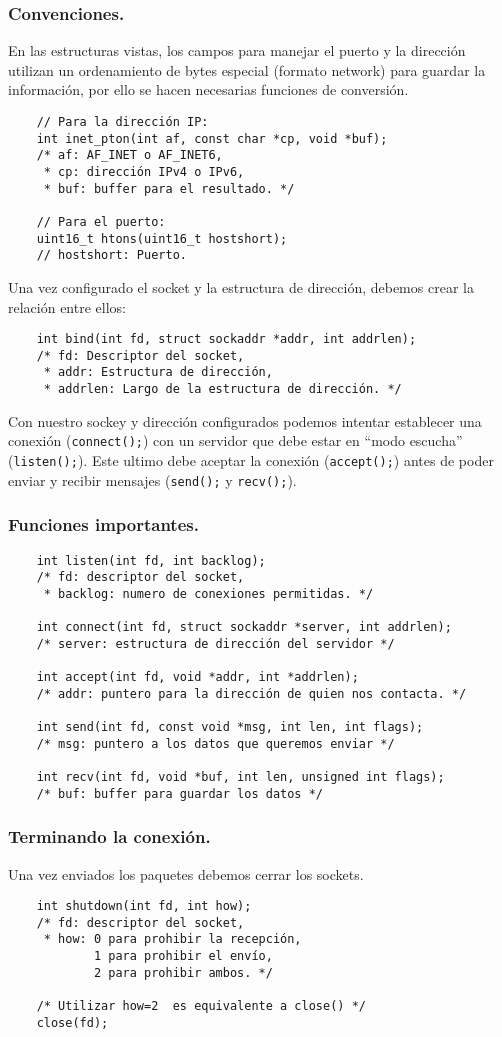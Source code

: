 \documentclass{beamer}
\begin{document}
\begin{frame}[fragile]
	\frametitle{Convenciones.}
	En las estructuras vistas, los campos para manejar el puerto y la dirección 
	utilizan un ordenamiento de bytes especial (formato network) para guardar
	la información, por ello se hacen necesarias funciones de conversión.
	\begin{verbatim}
	// Para la dirección IP:
	int inet_pton(int af, const char *cp, void *buf);
	/* af: AF_INET o AF_INET6, 
	 * cp: dirección IPv4 o IPv6, 
	 * buf: buffer para el resultado. */

	// Para el puerto:
	uint16_t htons(uint16_t hostshort);
	// hostshort: Puerto.
	\end{verbatim}
\end{frame}

\begin{frame}[fragile]
	Una vez configurado el socket y la estructura de dirección, debemos crear
	la relación entre ellos:
	\begin{verbatim}
	int bind(int fd, struct sockaddr *addr, int addrlen);
	/* fd: Descriptor del socket,
	 * addr: Estructura de dirección,
	 * addrlen: Largo de la estructura de dirección. */
	\end{verbatim}
	Con nuestro sockey y dirección configurados podemos intentar establecer una
	conexión (\texttt{connect();}) con un servidor que debe estar en ``modo 
	escucha'' (\texttt{listen();}). Este ultimo debe aceptar la conexión 
	(\texttt{accept();}) antes de poder enviar y recibir mensajes
	(\texttt{send();} y \texttt{recv();}).
\end{frame}

\begin{frame}[fragile]
	\frametitle{Funciones importantes.}
	\small
	\begin{verbatim}
	int listen(int fd, int backlog);
	/* fd: descriptor del socket,
	 * backlog: numero de conexiones permitidas. */ 
	
	int connect(int fd, struct sockaddr *server, int addrlen);
	/* server: estructura de dirección del servidor */

	int accept(int fd, void *addr, int *addrlen);
	/* addr: puntero para la dirección de quien nos contacta. */

	int send(int fd, const void *msg, int len, int flags);
	/* msg: puntero a los datos que queremos enviar */

	int recv(int fd, void *buf, int len, unsigned int flags);
	/* buf: buffer para guardar los datos */
	\end{verbatim}
\end{frame}

\begin{frame}[fragile]
	\frametitle{Terminando la conexión.}
	Una vez enviados los paquetes debemos cerrar los sockets.
	\small
	\begin{verbatim}
	int shutdown(int fd, int how);
	/* fd: descriptor del socket,
	 * how: 0 para prohibir la recepción,
	        1 para prohibir el envío,
	        2 para prohibir ambos. */
	
	/* Utilizar how=2  es equivalente a close() */
	close(fd);
	\end{verbatim}
\end{frame}
\end{document}
